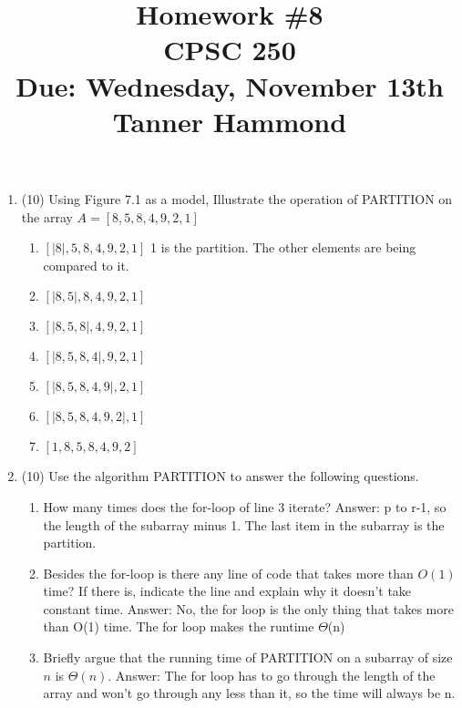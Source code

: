 \documentclass[12pt]{article}
\begin{document}

\title{Homework \#8 \\ CPSC 250 \\ Due: Wednesday, November 13th \\Tanner Hammond}%
\date{}

\maketitle

\begin{enumerate}
\item (10) Using Figure 7.1 as a model, Illustrate the operation of PARTITION on the array
$A = [8,5,8,4,9,2,1]$
\begin{enumerate}
\item $[|8|,5,8,4,9,2,1]$ 1 is the partition. The other elements are being compared to it. 
\item $[|8,5|,8,4,9,2,1]$
\item $[|8,5,8|,4,9,2,1]$
\item $[|8,5,8,4|,9,2,1]$
\item $[|8,5,8,4,9|,2,1]$
\item $[|8,5,8,4,9,2|,1]$
\item $[1,8,5,8,4,9,2]$
\end{enumerate}

\item (10) Use the algorithm PARTITION to answer the following questions.
\begin{enumerate}
\item How many times does the for-loop of line 3 iterate? \newline Answer: p to r-1, so the length of the subarray minus 1. The last item in the subarray is the partition.
\item Besides the for-loop is there any line of code that takes more than $O(1)$ time? If there
is, indicate the line and explain why it doesn't take constant time. \newline Answer: No, the for loop is the only thing that takes more than O(1) time. The for loop makes the runtime $\Theta$(n)
\item Briefly argue that the running time of PARTITION on a subarray of size $n$ is $\Theta(n)$.
\newline Answer: The for loop has to go through the length of the array and won't go through any less than it, so the time will always be n.
\end{enumerate}


\end{enumerate}
\end{document}
